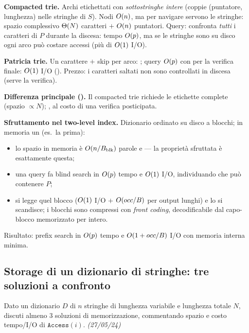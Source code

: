 \textbf{Compacted trie.} Archi etichettati con \emph{sottostringhe intere} (coppie
(puntatore, lunghezza) nelle stringhe di $S$). Nodi $O\!\left(n\right)$, ma per navigare servono le stringhe:
spazio complessivo $\Theta\!\left(N\right)$ caratteri $+$ $O\!\left(n\right)$ puntatori. Query: confronta \emph{tutti} i
caratteri di $P$ durante la discesa: tempo $O\!\left(p\right)$, ma se le stringhe sono su disco ogni arco
pu\`o costare accessi (pi\`u di $O\!\left(1\right)$ I/O).

\textbf{Patricia trie.} Un carattere $+$ skip per arco: ; query $O\!\left(p\right)$ con  per la verifica finale: $O\!\left(1\right)$
I/O (). Prezzo: i caratteri saltati non sono controllati in discesa (serve la verifica).

\textbf{Differenza principale ().} Il compacted trie richiede le etichette complete
(spazio $\propto N$); , al costo di una verifica posticipata.

\textbf{Sfruttamento nel two-level index.} Dizionario ordinato su disco a blocchi; in memoria un
 (es.\ la prima):
\begin{itemize}[leftmargin=1.6em,itemsep=1pt]
\item lo spazio in memoria \`e $O\!\left(n/B_{\mathrm{blk}}\right)$ parole e  --- la propriet\`a sfruttata \`e esattamente questa;
\item una query fa blind search in $O\!\left(p\right)$ tempo e $O\!\left(1\right)$ I/O, individuando 
che pu\`o contenere $P$;
\item si legge quel blocco ($O\!\left(1\right)$ I/O $+$ $O\!\left(occ/B\right)$ per output lunghi) e lo si scandisce;
i blocchi sono compressi con \emph{front coding}, decodificabile dal capo-blocco memorizzato per
intero.
\end{itemize}
Risultato: prefix search in $O\!\left(p\right)$ tempo e $O\!\left(1+occ/B\right)$ I/O con memoria interna minima.

\subsection*{ Storage di un dizionario di stringhe: tre soluzioni a confronto}

\begin{domanda}
Dato un dizionario $D$ di $n$ stringhe di lunghezza variabile e lunghezza totale $N$, discuti
almeno 3 soluzioni di memorizzazione, commentando spazio e costo tempo/I/O di
$\texttt{Access}(i)$. \emph{(27/05/24)}
\end{domanda}

